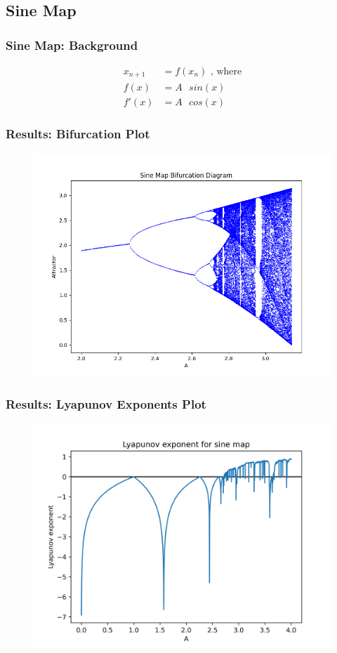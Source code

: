 \documentclass[
	11pt, %
	aspectratio=169, %
]{beamer}
\begin{document}

\subsection{Sine Map}

\begin{frame}
        \frametitle{Sine Map: Background}
        \begin{align*}
            x_{n+1} &= f(x_n) \text{ , where}\\
            f(x) &= A\text{ }sin(x) \\
            f'(x) &= A\text{ }cos(x)
        \end{align*}
\end{frame}


\begin{frame}
        \frametitle{Results: Bifurcation Plot}
    \begin{figure}
        \includegraphics[width=0.6\linewidth]
        {sine_bifurcation_diagram.png}
    \end{figure}
\end{frame}


\begin{frame}
        \frametitle{Results: Lyapunov Exponents Plot}
    \begin{figure}
        \includegraphics[width=0.6\linewidth]
        {sine_lyapunov_exp.png}
    \end{figure}
\end{frame}
\end{document}
